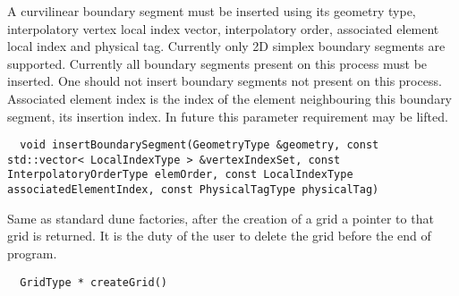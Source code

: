 \noindent
A curvilinear boundary segment must be inserted using its geometry type, interpolatory vertex local index vector, interpolatory order, associated element local index and physical tag. Currently only 2D simplex boundary segments are supported. Currently all boundary segments present on this process must be inserted. One should not insert boundary segments not present on this process. Associated element index is the index of the element neighbouring this boundary segment, its insertion index. In future this parameter requirement may be lifted.     \\

\begin{mybox}
\begin{lstlisting}
  void insertBoundarySegment(GeometryType &geometry, const std::vector< LocalIndexType > &vertexIndexSet, const InterpolatoryOrderType elemOrder, const LocalIndexType associatedElementIndex, const PhysicalTagType physicalTag)
\end{lstlisting}
\end{mybox}


\noindent
Same as standard dune factories, after the creation of a grid a pointer to that grid is returned. It is the duty of the user to delete the grid before the end of program.

\begin{mybox}
\begin{lstlisting}
  GridType * createGrid()
\end{lstlisting}
\end{mybox}
